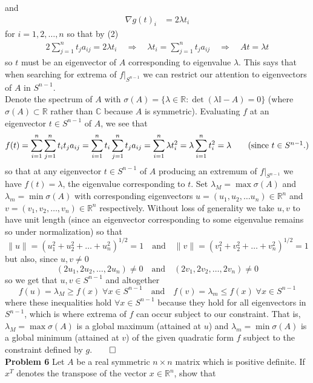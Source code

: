 \documentclass[11pt, letterpaper]{article}
\newcommand{\mbb}[1]{\mathbb{#1}}
\begin{document}
    and
    \begin{align*}
        \nabla g(t)_i&=2\lambda t_i
    \end{align*}
    for $i=1,2,\dots, n$ so that by (2)
    \begin{align*}
        2\sum_{j=1}^nt_ja_{ij}=2\lambda t_i\quad\Rightarrow\quad \lambda t_i=\sum_{j=1}^n t_ja_{ij}\quad\Rightarrow\quad At=\lambda t
    \end{align*}
    so $t$ must be an eigenvector of $A$ corresponding to eigenvalue $\lambda$. This says that when searching for extrema of $f|_{S^{n-1}}$ we can restrict our attention to eigenvectors of $A$ in $S^{n-1}$.\\[10pt]
    Denote the spectrum of $A$ with $\sigma(A)=\{\lambda\in\mbb{R}:\det(\lambda\mbb{I}-A)=0\}$ (where $\sigma(A)\subset\mbb{R}$ rather than $\mbb{C}$ because $A$ is symmetric). Evaluating $f$ at an eigenvector $t\in S^{n-1}$ of $A$, we see that
    \[f(t)=\sum_{i=1}^n\sum_{j=1}^nt_it_ja_{ij}=\sum_{i=1}^nt_i\sum_{j=1}^nt_ja_{ij}=\sum_{i=1}^n\lambda t_i^2=\lambda\sum_{i=1}^n t_i^2=\lambda\tag{since $t\in S^{n-1}$.}\]
    so that at any eigenvector $t\in S^{n-1}$ of $A$ producing an extremum of $f|_{S^{n-1}}$ we have $f(t)=\lambda$, the eigenvalue corresponding to $t$. Set $\lambda_M=\max\sigma(A)$ and $\lambda_m=\min\sigma(A)$ with corresponding eigenvectors
    $u=(u_1,u_2,\dots u_n)\in\mbb{R}^n$ and $v=(v_1,v_2,\dots,v_n)\in\mbb{R}^n$ respectively. Without loss of generality we take $u,v$ to have unit length (since an eigenvector corresponding to some eigenvalue remains so under normalization) so that
    \[\|u\|=(u_1^2+u_2^2+\dots+u^2_n)^{1/2}=1\quad\text{and}\quad \|v\|=(v^2_1+v^2_2+\dots+v^2_n)^{1/2}=1\]
    but also, since $u,v\neq 0$
    \[(2u_1,2u_2,\dots,2u_n)\neq 0\quad\text{and}\quad (2v_1,2v_2,\dots,2v_n)\neq 0\]
    so we get that $u,v\in S^{n-1}$ and altogether
    \[f(u)=\lambda_M\geq f(x)\;\forall x\in S^{n-1}\quad\text{and}\quad f(v)=\lambda_m\leq f(x)\;\forall x\in S^{n-1}\]
    where these inequalities hold $\forall x\in S^{n-1}$ because they hold for all eigenvectors in $S^{n-1}$, which is where extrema of $f$ can occur subject to our constraint. That is,
    $\lambda_M=\max\sigma(A)$ is a global maximum (attained at $u$) and $\lambda_m=\min\sigma(A)$ is a global minimum (attained at $v$) of the given quadratic form $f$ subject to the constraint defined by $g$.\hfill{$\qed$}\\[10pt]
    {\bf Problem 6} Let $A$ be a real symmetric $n\times n$ matrix which is positive definite. If $x^T$ denotes the transpose of the vector $x\in\mbb{R}^n$, show that
\end{document}
